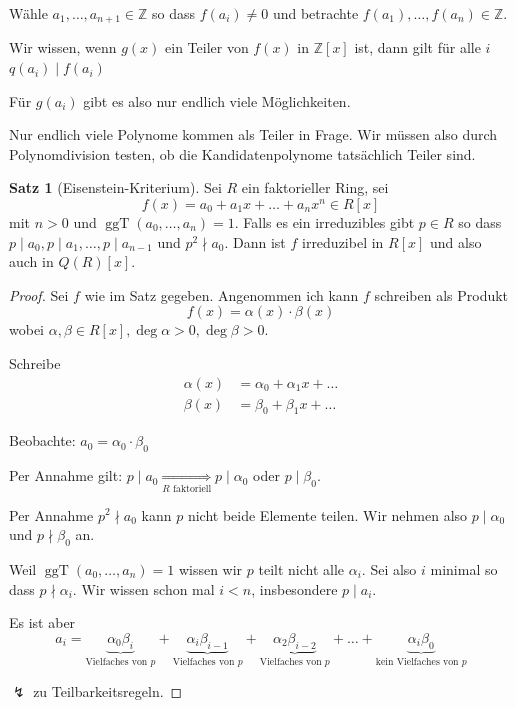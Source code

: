 \documentclass[12pt,parskip=full]{scrartcl}
\newcommand{\setZ}{\mathbb{Z}}
\theoremstyle{definition}
\newtheorem{theorem}{Satz}[section]
\theoremstyle{remark}
\begin{document}
	Wähle $a_1, \dots, a_{n+1} \in \setZ$ so dass $f(a_i) \neq 0$ und betrachte $f(a_1), \dots, f(a_n) \in \setZ$.
	
	Wir wissen, wenn $g(x)$ ein Teiler von $f(x)$ in $\setZ[x]$ ist, dann gilt für alle $i$ $q(a_i) \mid f(a_i)$
	
	Für $g(a_i)$ gibt es also nur endlich viele Möglichkeiten.
	
	Nur endlich viele Polynome kommen als Teiler in Frage. Wir müssen also durch Polynomdivision testen, ob die Kandidatenpolynome tatsächlich Teiler sind.
	
	\begin{theorem}[Eisenstein-Kriterium]
		Sei $R$ ein faktorieller Ring, sei\begin{equation*}
			f(x) = a_0 + a_1 x + \dots + a_n x^n \in R[x]
		\end{equation*}
		mit $n > 0$ und $\operatorname{ggT}(a_0, \dots, a_n) = 1$. Falls es ein irreduzibles gibt $p \in R$ so dass $p \mid a_0, p \mid a_1, \dots, p \mid a_{n-1}$ und $p^2 \nmid a_0$. Dann ist $f$ irreduzibel in $R[x]$ und also auch in $Q(R)[x]$.
	\end{theorem}

	\begin{proof}
		Sei $f$ wie im Satz gegeben. Angenommen ich kann $f$ schreiben als Produkt
		\begin{equation*}
		f(x) = \alpha(x) \cdot \beta(x)
		\end{equation*}
		wobei $\alpha, \beta \in R[x], \deg \alpha > 0, \deg \beta > 0$.
		
		Schreibe
		\begin{align*}
			\alpha(x) &= \alpha_0 + \alpha_1 x + \dots \\
			\beta(x) &= \beta_0 + \beta_1 x + \dots
		\end{align*}
		
		Beobachte: $a_0 = \alpha_0 \cdot \beta_0$
		
		Per Annahme gilt: $p \mid a_0 \underset{\text{$R$ faktoriell}}{\Rightarrow} p \mid \alpha_0$ oder $p \mid \beta_0$.
		
		Per Annahme $p^2 \nmid a_0$ kann $p$ nicht beide Elemente teilen. Wir nehmen also $p \mid \alpha_0$ und $p \nmid \beta_0$ an.
		
		Weil $\operatorname{ggT}(a_0, \dots, a_n) = 1$ wissen wir $p$ teilt nicht alle $\alpha_i$. Sei also $i$ minimal so dass $p \nmid \alpha_i$. Wir wissen schon mal $i < n$, insbesondere $p \mid a_i$.
		
		Es ist aber
		\begin{equation*}
			a_i = \underbrace{\alpha_0 \beta_i}_\text{Vielfaches von $p$} + \underbrace{\alpha_i \beta_{i-1}}_\text{Vielfaches von $p$} + \underbrace{\alpha_2 \beta_{i-2}}_\text{Vielfaches von $p$} + \dots + \underbrace{\alpha_i \beta_0}_\text{kein Vielfaches von $p$}
		\end{equation*}
		
		$\lightning$ zu Teilbarkeitsregeln.
	\end{proof}
\end{document}
